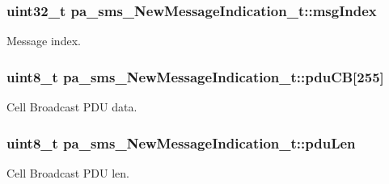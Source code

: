 \subsubsection[{\texorpdfstring{msg\+Index}{msgIndex}}]{\setlength{\rightskip}{0pt plus 5cm}uint32\+\_\+t pa\+\_\+sms\+\_\+\+New\+Message\+Indication\+\_\+t\+::msg\+Index}\hypertarget{structpa__sms___new_message_indication__t_af1fa8e8b8c39fbe0fd4366d39e7aad86}{}\label{structpa__sms___new_message_indication__t_af1fa8e8b8c39fbe0fd4366d39e7aad86}


Message index. 

\subsubsection[{\texorpdfstring{pdu\+CB}{pduCB}}]{\setlength{\rightskip}{0pt plus 5cm}uint8\+\_\+t pa\+\_\+sms\+\_\+\+New\+Message\+Indication\+\_\+t\+::pdu\+CB\mbox{[}255\mbox{]}}\hypertarget{structpa__sms___new_message_indication__t_ab41110bad0ac46a7c365fe562c35b0a0}{}\label{structpa__sms___new_message_indication__t_ab41110bad0ac46a7c365fe562c35b0a0}


Cell Broadcast P\+DU data. 

\subsubsection[{\texorpdfstring{pdu\+Len}{pduLen}}]{\setlength{\rightskip}{0pt plus 5cm}uint8\+\_\+t pa\+\_\+sms\+\_\+\+New\+Message\+Indication\+\_\+t\+::pdu\+Len}\hypertarget{structpa__sms___new_message_indication__t_a00dc7fc944f19d93d3291d476cee480f}{}\label{structpa__sms___new_message_indication__t_a00dc7fc944f19d93d3291d476cee480f}


Cell Broadcast P\+DU len. 

